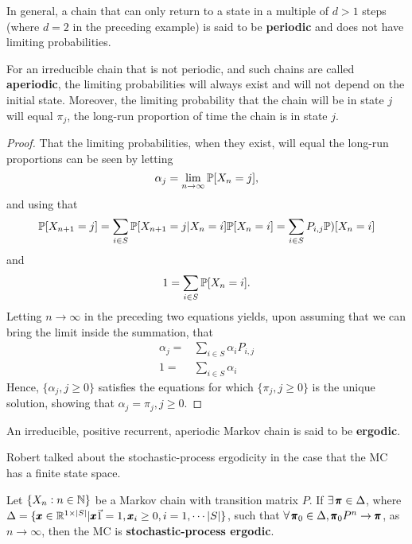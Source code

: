 \begin{definition}[Periodicity]
    In general, a chain that
    can only return to a state in a multiple of $d > 1$ steps (where $d = 2$ in the preceding
    example) is said to be \textbf{periodic} and does not have limiting probabilities. 
\end{definition}

\begin{proposition}
    For an irreducible chain that is not periodic, and such chains are called \textbf{aperiodic},
    the limiting probabilities will always exist and will not depend on the initial state.
    Moreover, the limiting probability that the chain will be in state $j$ will equal $\pi_j$, the long-run proportion of time the chain is in state $j$.

    \begin{proof}
        That the limiting probabilities,
        when they exist, will equal the long-run proportions can be seen by letting
        $$
        \alpha_j = \lim_{n\to\infty} \mathbb{P} [X_n = j],
        $$
        and using that 
        $$
        \mathbb{P} [ X_{n+1} = j ] = \sum_{i \in S} \mathbb{P} [X_{n+1} = j | X_n = i] \mathbb{P} [X_n = i] = \sum_{i \in S} P_{i,j} \mathbb{P})[X_n = i]
        $$
        and 
        $$
        1 = \sum_{i \in S} \mathbb{P} [ X_n = i].
        $$
        Letting $n \to \infty$ in the preceding two equations yields, upon assuming that we can bring the limit inside the summation, that
        \begin{align*}
            \alpha_j = & \sum_{i \in S} \alpha_i P_{i,j}  \\
            1 = & \sum_{i \in S} \alpha_i
        \end{align*}
        Hence, $\{\alpha_j , j \ge 0\}$ satisfies the equations for which $\{\pi_j , j \ge 0\}$ is the unique solution, showing that $\alpha_j = \pi_j, j \ge 0$.
    \end{proof}
\end{proposition}

\begin{definition}[Ergodicity]
    An irreducible, positive recurrent, aperiodic Markov chain is said to be \textbf{ergodic}. 
\end{definition}


Robert talked about the stochastic-process ergodicity in the case that the MC has a finite state space. 

\begin{definition}
    Let $\{X_n: n \in \mathbb{N}\}$ be a Markov chain with transition matrix $P$. If $\exists \, \pmb{\pi} \in \Delta$, where $\Delta = \{ \pmb{x} \in \mathbb{R}^{1 \times |S|}| \pmb{x} \vec{1} = 1, \pmb{x}_i \ge 0, i = 1, \cdots |S|\}$, such that $\forall \, \pmb{\pi}_0 \in \Delta, \pmb{\pi}_0 P^n \to \pmb{\pi}$, as $n \to \infty$, then the MC is \textbf{stochastic-process ergodic}. 
\end{definition}

